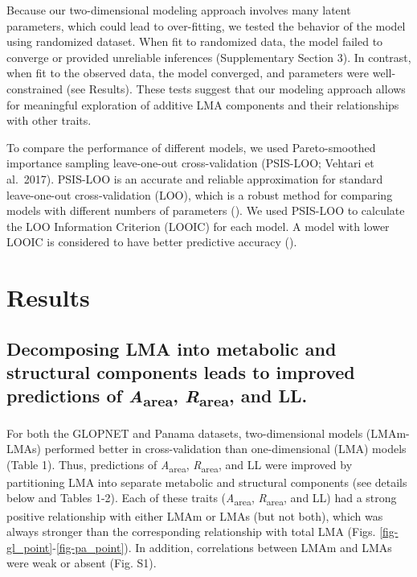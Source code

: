 \documentclass[
  12pt,
  letterpaper,
  DIV=11,
  numbers=noendperiod]{scrartcl}
\begin{document}
Because our two-dimensional modeling approach involves many latent
parameters, which could lead to over-fitting, we tested the behavior of
the model using randomized dataset. When fit to randomized data, the
model failed to converge or provided unreliable inferences
(Supplementary Section 3). In contrast, when fit to the observed data,
the model converged, and parameters were well-constrained (see Results).
These tests suggest that our modeling approach allows for meaningful
exploration of additive LMA components and their relationships with
other traits.

To compare the performance of different models, we used Pareto-smoothed
importance sampling leave-one-out cross-validation (PSIS-LOO; Vehtari et
al.~2017). PSIS-LOO is an accurate and reliable approximation for
standard leave-one-out cross-validation (LOO), which is a robust method
for comparing models with different numbers of parameters
(). We used PSIS-LOO to
calculate the LOO Information Criterion (LOOIC) for each model. A model
with lower LOOIC is considered to have better predictive accuracy
().

\section{Results}\label{results}

\subsection{\texorpdfstring{Decomposing LMA into metabolic and
structural components leads to improved predictions of
\emph{A}\textsubscript{area}, \emph{R}\textsubscript{area}, and
LL.}{Decomposing LMA into metabolic and structural components leads to improved predictions of Aarea, Rarea, and LL.}}\label{decomposing-lma-into-metabolic-and-structural-components-leads-to-improved-predictions-of-aarea-rarea-and-ll.}

For both the GLOPNET and Panama datasets, two-dimensional models
(LMAm-LMAs) performed better in cross-validation than one-dimensional
(LMA) models (Table 1). Thus, predictions of
\emph{A}\textsubscript{area}, \emph{R}\textsubscript{area}, and LL were
improved by partitioning LMA into separate metabolic and structural
components (see details below and Tables 1-2). Each of these traits
(\emph{A}\textsubscript{area}, \emph{R}\textsubscript{area}, and LL) had
a strong positive relationship with either LMAm or LMAs (but not both),
which was always stronger than the corresponding relationship with total
LMA (Figs. \ref{fig-gl_point}-\ref{fig-pa_point}). In addition,
correlations between LMAm and LMAs were weak or absent (Fig. S1).
\end{document}
